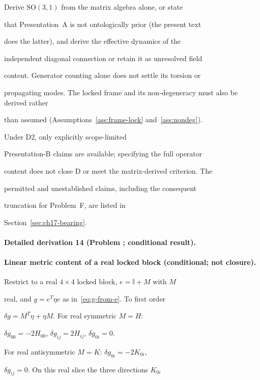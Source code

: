 Derive \(\mathrm{SO}(3,1)\) from the matrix algebra alone, or state

that Presentation~A is not ontologically prior (the present text

does the latter), and derive the effective dynamics of the

independent diagonal connection or retain it as unresolved field

content. Generator counting alone does not settle its torsion or

propagating modes. The locked frame and its non-degeneracy must also be derived rather

than assumed (Assumptions~\ref{ass:frame-lock} and~\ref{ass:nondeg}).

Under D2, only explicitly scope-limited

Presentation-B claims are available; specifying the full operator

content does not close D or meet the matrix-derived criterion. The

permitted and unestablished claims, including the consequent

truncation for Problem~F, are listed in

Section~\ref{sec:ch17-bearing}.



\paragraph{Detailed derivation 14 (Problem ; conditional result).} \label{ref:detail-13} %



\paragraph{Linear metric content of a real locked block (conditional; not closure).}

Restrict to a real \(4\times4\) locked block, \(e=\mathbb{I}+M\) with \(M\)

real, and \(g=e^{T}\eta e\) as in~\eqref{eq:g-from-e}. To first order

\(\delta g=M^{T}\eta+\eta M\). For real symmetric \(M=H\):

\(\delta g_{00}=-2H_{00}\), \(\delta g_{ij}=2H_{ij}\), \(\delta g_{0i}=0\).

For real antisymmetric \(M=K\): \(\delta g_{0i}=-2K_{0i}\),

\(\delta g_{ij}=0\). On this real slice the three directions \(K_{0i}\)

